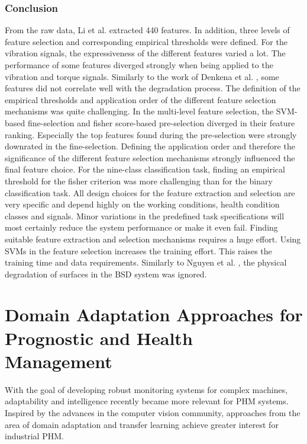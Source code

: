 \subsubsection{Conclusion}
From the raw data, Li et al. \cite{LiPin2018} extracted 440 features. In addition, three levels of feature selection and corresponding empirical thresholds were defined. For the vibration signals, the expressiveness of the different features varied a lot. The performance of some features diverged strongly when being applied to the vibration and torque signals. Similarly to the work of Denkena et al. \cite{Denkena2021}, some features did not correlate well with the degradation process. The definition of the empirical thresholds and application order of the different feature selection mechanisms was quite challenging. In the multi-level feature selection, the SVM-based fine-selection and fisher score-based pre-selection diverged in their feature ranking. Especially the top features found during the pre-selection were strongly downrated in the fine-selection. Defining the application order and therefore the significance of the different feature selection mechanisms strongly influenced the final feature choice. For the nine-class classification task, finding an empirical threshold for the fisher criterion was more challenging than for the binary classification task. All design choices for the feature extraction and selection are very specific and depend highly on the working conditions, health condition classes and signals. Minor variations in the predefined task specifications will most certainly reduce the system performance or make it even fail. Finding suitable feature extraction and selection mechanisms requires a huge effort. Using SVMs in the feature selection increases the training effort. This raises the training time and data requirements. Similarly to Nguyen et al. \cite{NGUYEN2019}, the physical degradation of surfaces in the BSD system was ignored. 


\section{Domain Adaptation Approaches for Prognostic and Health Management}
With the goal of developing robust monitoring systems for complex machines, adaptability and intelligence recently became more relevant for PHM systems. Inspired by the advances in the computer vision community, approaches from the area of domain adaptation and transfer learning achieve greater interest for industrial PHM. 


